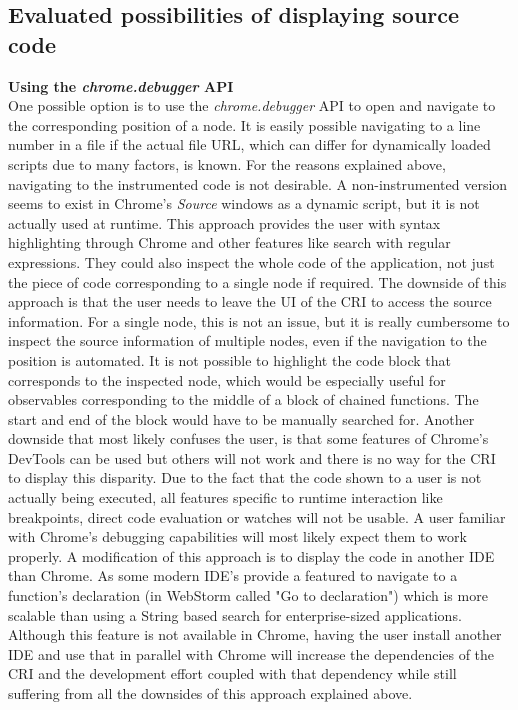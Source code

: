 \subsection{Evaluated possibilities of displaying source code}
\textbf{Using the \emph{chrome.debugger} API}\\
One possible option is to use the \emph{chrome.debugger} API to open and navigate to the corresponding position of a node. It is easily possible navigating to a line number in a file if the actual file URL, which can differ for dynamically loaded scripts due to many factors, is known. For the reasons explained above, navigating to the instrumented code is not desirable. A non-instrumented version seems to exist in Chrome's \emph{Source} windows as a dynamic script, but it is not actually used at runtime. This approach provides the user with syntax highlighting through Chrome and other features like search with regular expressions. They could also inspect the whole code of the application, not just the piece of code corresponding to a single node if required. The downside of this approach is that the user needs to leave the UI of the CRI to access the source information. For a single node, this is not an issue, but it is really cumbersome to inspect the source information of multiple nodes, even if the navigation to the position is automated. It is not possible to highlight the code block that corresponds to the inspected node, which would be especially useful for observables corresponding to the middle of a block of chained functions. The start and end of the block would have to be manually searched for. Another downside that most likely confuses the user, is that some features of Chrome's DevTools can be used but others will not work and there is no way for the CRI to display this disparity. Due to the fact that the code shown to a user is not actually being executed, all features specific to runtime interaction like breakpoints, direct code evaluation or watches will not be usable. A user familiar with Chrome's debugging capabilities will most likely expect them to work properly. A modification of this approach is to display the code in another IDE than Chrome. As some modern IDE's provide a featured to navigate to a function's declaration (in WebStorm called "Go to declaration") which is more scalable than using a String based search for enterprise-sized applications. Although this feature is not available in Chrome, having the user install another IDE and use that in parallel with Chrome will increase the dependencies of the CRI and the development effort coupled with that dependency while still suffering from all the downsides of this approach explained above.\\
